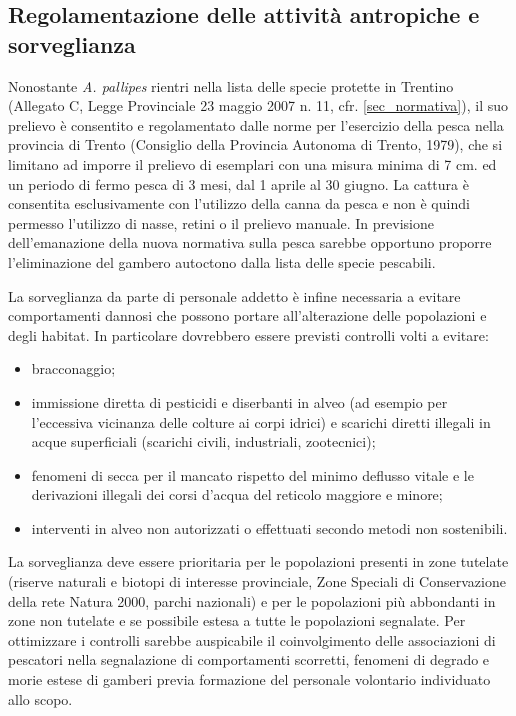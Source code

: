 \documentclass[11pt,a4paper,italian,twoside,openany]{memoir}
\begin{document}
\subsection{Regolamentazione delle attività antropiche e sorveglianza}
Nonostante \emph{A. pallipes} rientri nella lista delle specie protette in Trentino (Allegato C, Legge Provinciale 23 maggio 2007 n. 11, cfr. \ref{sec_normativa}), il suo prelievo è consentito e regolamentato dalle norme per l'esercizio della pesca nella provincia di Trento (Consiglio della Provincia Autonoma di Trento, 1979), che si limitano ad imporre il prelievo di esemplari con una misura minima di 7 cm. ed un periodo di fermo pesca di 3 mesi, dal 1 aprile al 30 giugno. La cattura è consentita esclusivamente con l'utilizzo della canna da pesca e non è quindi permesso l'utilizzo di nasse, retini o il prelievo manuale. In previsione dell'emanazione della nuova normativa sulla pesca sarebbe opportuno proporre l'eliminazione del gambero autoctono  dalla lista delle specie pescabili.

La sorveglianza da parte di personale addetto è infine necessaria a evitare comportamenti dannosi che possono portare all'alterazione delle popolazioni e degli habitat. In particolare dovrebbero essere previsti controlli volti a evitare:
\begin{itemize}
  \item bracconaggio;
  \item immissione diretta di pesticidi e diserbanti in alveo (ad esempio per l'eccessiva vicinanza delle colture ai corpi idrici) e scarichi diretti illegali in acque superficiali (scarichi civili, industriali, zootecnici);
  \item fenomeni di secca per il mancato rispetto del minimo deflusso vitale e le derivazioni illegali dei corsi d'acqua del reticolo maggiore e minore;
  \item interventi in alveo non autorizzati o effettuati secondo metodi non sostenibili.
\end{itemize}

La sorveglianza deve essere prioritaria per le popolazioni presenti in zone tutelate (riserve naturali e biotopi di interesse provinciale, Zone Speciali di Conservazione della rete Natura 2000, parchi nazionali) e per le popolazioni più abbondanti in zone non tutelate e se possibile estesa a tutte le popolazioni segnalate. Per ottimizzare i controlli sarebbe auspicabile il coinvolgimento delle associazioni di pescatori nella segnalazione di comportamenti scorretti, fenomeni di degrado e morie estese di gamberi previa formazione del personale volontario individuato allo scopo.
\end{document}
